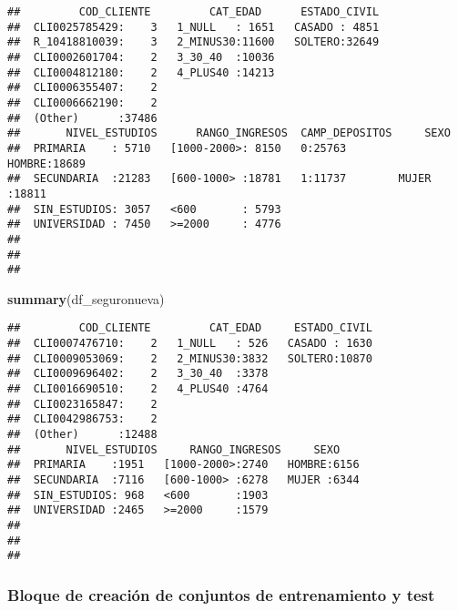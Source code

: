 \documentclass[]{article}
\newenvironment{Shaded}{\begin{snugshade}}{\end{snugshade}}
\newcommand{\KeywordTok}[1]{\textcolor[rgb]{0.13,0.29,0.53}{\textbf{#1}}}
\newcommand{\NormalTok}[1]{#1}
\begin{document}
\begin{verbatim}
##         COD_CLIENTE         CAT_EDAD      ESTADO_CIVIL  
##  CLI0025785429:    3   1_NULL   : 1651   CASADO : 4851  
##  R_10418810039:    3   2_MINUS30:11600   SOLTERO:32649  
##  CLI0002601704:    2   3_30_40  :10036                  
##  CLI0004812180:    2   4_PLUS40 :14213                  
##  CLI0006355407:    2                                    
##  CLI0006662190:    2                                    
##  (Other)      :37486                                    
##       NIVEL_ESTUDIOS      RANGO_INGRESOS  CAMP_DEPOSITOS     SEXO      
##  PRIMARIA    : 5710   [1000-2000>: 8150   0:25763        HOMBRE:18689  
##  SECUNDARIA  :21283   [600-1000> :18781   1:11737        MUJER :18811  
##  SIN_ESTUDIOS: 3057   <600       : 5793                                
##  UNIVERSIDAD : 7450   >=2000     : 4776                                
##                                                                        
##                                                                        
## 
\end{verbatim}

\begin{Shaded}
\begin{Highlighting}[]
\KeywordTok{summary}\NormalTok{(df_seguronueva)}
\end{Highlighting}
\end{Shaded}

\begin{verbatim}
##         COD_CLIENTE         CAT_EDAD     ESTADO_CIVIL  
##  CLI0007476710:    2   1_NULL   : 526   CASADO : 1630  
##  CLI0009053069:    2   2_MINUS30:3832   SOLTERO:10870  
##  CLI0009696402:    2   3_30_40  :3378                  
##  CLI0016690510:    2   4_PLUS40 :4764                  
##  CLI0023165847:    2                                   
##  CLI0042986753:    2                                   
##  (Other)      :12488                                   
##       NIVEL_ESTUDIOS     RANGO_INGRESOS     SEXO     
##  PRIMARIA    :1951   [1000-2000>:2740   HOMBRE:6156  
##  SECUNDARIA  :7116   [600-1000> :6278   MUJER :6344  
##  SIN_ESTUDIOS: 968   <600       :1903                
##  UNIVERSIDAD :2465   >=2000     :1579                
##                                                      
##                                                      
## 
\end{verbatim}

\subsubsection{Bloque de creación de conjuntos de entrenamiento y
test}\label{bloque-de-creacion-de-conjuntos-de-entrenamiento-y-test}
\end{document}
